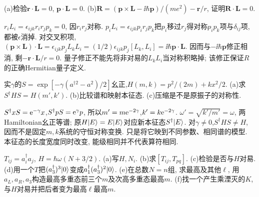 \begin{exercise}
(a)检验$\boldsymbol r\cdot\boldsymbol L=0$, $\boldsymbol p\cdot\boldsymbol L=0$. (b)$\boldsymbol R=(\boldsymbol p\times\boldsymbol L-\ii\hbar\boldsymbol p)/(me^2)-\boldsymbol r/r$, 证明$\boldsymbol R\cdot\boldsymbol L=0$.
\end{exercise}
\begin{solution}
$r_iL_i=\epsilon_{ijk}r_ir_jp_k=0$, 因$r_ir_j$对称. $p_iL_i=\epsilon_{ijk}p_ir_jp_k$把$p_i$移过$r_j$得对称$p_ip_k$项与$\delta_{ij}$项, 都被$\epsilon$消掉. 对交叉积项,
$(\boldsymbol p\times\boldsymbol L)\cdot\boldsymbol L=\epsilon_{ijk}p_jL_kL_i=(1/2)\epsilon_{ijk}p_j[L_k,L_i]=\ii\hbar\boldsymbol p\cdot\boldsymbol L$. 因而与$-\ii\hbar\boldsymbol p$修正相消, 剩$-\boldsymbol r\cdot\boldsymbol L/r=0$. 量子修正不能先将非对易的$L_kL_i$当对称积略掉; 该修正保证$R$的正确Hermitian量子定义.
\end{solution}
\begin{exercise}
实$\gamma$的$S=\exp[-\gamma(a^{\dagger2}-a^2)/2]$幺正,$H(m,k)=p^2/(2m)+kx^2/2$. (a)求$S^\dagger HS=H(m',k')$. (b)比较谱和映射本征态. (c)压缩是不是原振子的对称性.
\end{exercise}
\begin{solution}
$S^\dagger xS=\mathrm e^{-\gamma}x$,$S^\dagger pS=\mathrm e^\gamma p$, 所以$m'=m\mathrm e^{-2\gamma}$,$k'=k\mathrm e^{-2\gamma}$. $\omega'=\sqrt{k'/m'}=\omega$, 两Hamiltonian幺正等谱; 原$H\lvert E\rangle=E\lvert E\rangle$对应新本征态$S^\dagger\lvert E\rangle$. 对$\gamma\neq0$,$S^\dagger HS\neq H$, 因而不是固定$m,k$系统的守恒对称变换. 只是将它映到不同参数、相同谱的模型. 本征态的长度宽度同时改变, 能级相同并不代表算符相同.
\end{solution}
\begin{exercise}
$T_{ij}=a_i^\dagger a_j$, $H=\hbar\omega(N+3/2)$. (a)写$H,N_i$. (b)求$[T_{ij},T_{pq}]$. (c)检验是否与$H$对易. (d)用一个$T$把$(a_3^\dagger)^3\lvert 0\rangle$变成$a_1^\dagger(a_3^\dagger)^2\lvert 0\rangle$. (e)在总数$N=n$组, 求最高及其他$\ell$, 用$a_L,a_R,a_3$构造最高多重态前三个$m$及次高多重态最高$m$. (f)找一个产生乘湮灭的$K$, 与$H$对易并把后者变为最高$\ell$最高$m$.
\end{exercise}
